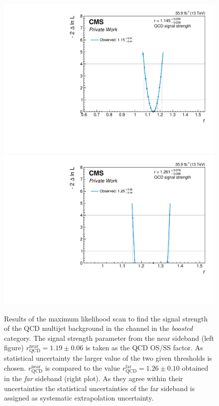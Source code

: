\begin{figure}[h!]
    \centering
    \includegraphics[width=.49\textwidth]{Figures/background_estimation/RQCDOSSS/Scans/mt_ZeroJet2D_antiiso_near/plots/nll.pdf}
    \includegraphics[width=.49\textwidth]{Figures/background_estimation/RQCDOSSS/Scans/mt_ZeroJet2D_antiiso_far/plots/nll.pdf}
    \caption[Results of the maximum likelihood scan for $R_\text{QCD}^\text{OS/SS}$ in the \mutau{} channel for the \textit{0-jet} category.]{Results of the maximum likelihood scan to find the signal strength of the QCD multijet background in the \mutau{} channel in the \textit{boosted} category.
    The signal strength parameter from the near sideband (left figure) $r^{\text{near}}_\text{QCD} = 1.19\pm 0.06$ is taken as the QCD OS/SS factor. As statistical uncertainty the larger value of the two given thresholds is chosen. 
    $r^{\text{near}}_\text{QCD}$ is compared to the value $r^{\text{far}}_\text{QCD} = 1.26\pm 0.10$ obtained in the \textit{far} sideband (right plot). As they agree within their uncertainties the statistical uncertainties of the far sideband is assigned as systematic extrapolation uncertainty.}\label{SUPPLE:BK:Scans:mt_0jet}
\end{figure}


